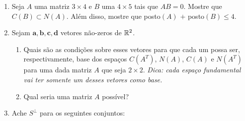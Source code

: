 \documentclass[leqno]{article}
\begin{document}
\begin{enumerate}
\begin{sol} 
\end{sol} 



\item Seja $A$ uma matriz $3 \times 4$ e $B$ uma $4 \times 5$ tais que $AB = 0$. Mostre que $C(B) \subset N(A)$. Além disso, mostre que posto$(A)$ $ + $ posto$(B) \leq 4$.

\begin{sol} 
\end{sol} 



\item Sejam $\mathbf{a,b,c,d}$ vetores não-zeros de $\mathbb{R}^2$.

\begin{enumerate}

\item Quais são as condições sobre esses vetores para que cada um possa ser, respectivamente, base dos espaços $C(A^T)$, $N(A)$, $C(A)$ e $N(A^T)$ para uma dada matriz $A$ que seja $2 \times 2$. \textit{Dica: cada espaço fundamental vai ter somente um desses vetores como base.}

\begin{sol} 
\end{sol} 

\item Qual seria uma matriz $A$ possível?

\begin{sol} 
\end{sol} 

\end{enumerate}



\item Ache $S^{\perp}$ para os seguintes conjuntos:

\begin{enumerate}


\end{enumerate}
\end{enumerate}
\end{document}
